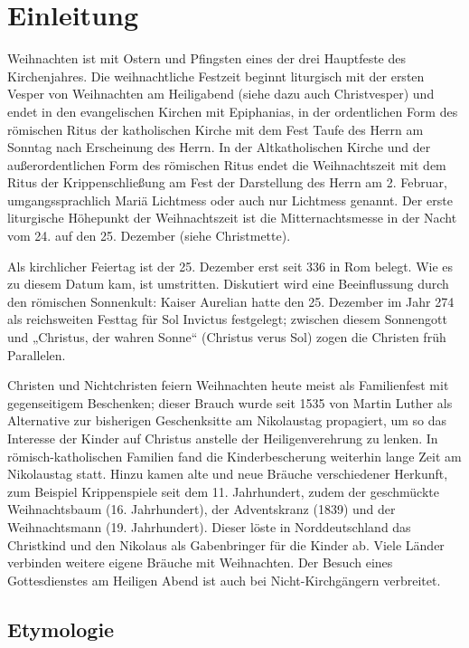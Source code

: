 
\chapter{Einleitung}
Weihnachten ist mit Ostern und Pfingsten eines der drei Hauptfeste des Kirchenjahres. Die weihnachtliche Festzeit beginnt liturgisch mit der ersten Vesper von Weihnachten am Heiligabend (siehe dazu auch Christvesper) und endet in den evangelischen Kirchen mit Epiphanias, in der ordentlichen Form des römischen Ritus der katholischen Kirche mit dem Fest Taufe des Herrn am Sonntag nach Erscheinung des Herrn. In der Altkatholischen Kirche und der außerordentlichen Form des römischen Ritus endet die Weihnachtszeit mit dem Ritus der Krippenschließung am Fest der Darstellung des Herrn am 2. Februar, umgangssprachlich Mariä Lichtmess oder auch nur Lichtmess genannt. Der erste liturgische Höhepunkt der Weihnachtszeit ist die Mitternachtsmesse in der Nacht vom 24. auf den 25. Dezember (siehe Christmette).

Als kirchlicher Feiertag ist der 25. Dezember erst seit 336 in Rom belegt. Wie es zu diesem Datum kam, ist umstritten. Diskutiert wird eine Beeinflussung durch den römischen Sonnenkult: Kaiser Aurelian hatte den 25. Dezember im Jahr 274 als reichsweiten Festtag für Sol Invictus festgelegt; zwischen diesem Sonnengott und „Christus, der wahren Sonne“ (Christus verus Sol) zogen die Christen früh Parallelen.

Christen und Nichtchristen feiern Weihnachten heute meist als Familienfest mit gegenseitigem Beschenken; dieser Brauch wurde seit 1535 von Martin Luther als Alternative zur bisherigen Geschenksitte am Nikolaustag propagiert, um so das Interesse der Kinder auf Christus anstelle der Heiligenverehrung zu lenken. In römisch-katholischen Familien fand die Kinderbescherung weiterhin lange Zeit am Nikolaustag statt. Hinzu kamen alte und neue Bräuche verschiedener Herkunft, zum Beispiel Krippenspiele seit dem 11. Jahrhundert, zudem der geschmückte Weihnachtsbaum (16. Jahrhundert), der Adventskranz (1839) und der Weihnachtsmann (19. Jahrhundert). Dieser löste in Norddeutschland das Christkind und den Nikolaus als Gabenbringer für die Kinder ab. Viele Länder verbinden weitere eigene Bräuche mit Weihnachten. Der Besuch eines Gottesdienstes am Heiligen Abend ist auch bei Nicht-Kirchgängern verbreitet.\cite{kurz}


\section{Etymologie}

